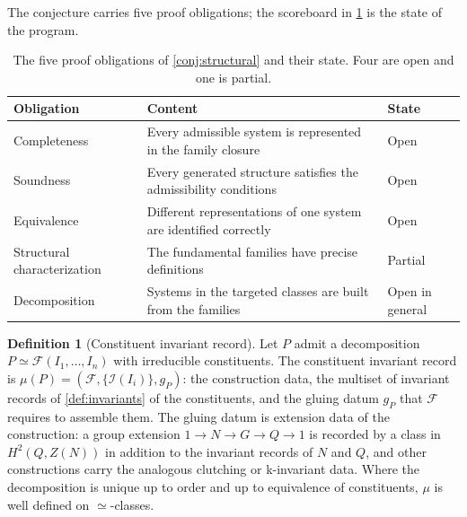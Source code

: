 \documentclass[11pt,letterpaper]{article}
\theoremstyle{definition}
\newtheorem{definition}[theorem]{Definition}
\begin{document}
The conjecture carries five proof obligations; the scoreboard in \cref{tab:obligations} is the state of the program.

\begin{table}[htbp]
\caption{The five proof obligations of \cref{conj:structural} and their state. Four are open and one is partial.}
\label{tab:obligations}
\small
\begin{tabularx}{\textwidth}{>{\hsize=0.77\hsize\raggedright\arraybackslash}X >{\hsize=1.67\hsize\raggedright\arraybackslash}X >{\hsize=0.56\hsize\raggedright\arraybackslash}X}
\toprule
Obligation & Content & State \\
\midrule
Completeness & Every admissible system is represented in the family closure & Open \\
Soundness & Every generated structure satisfies the admissibility conditions & Open \\
Equivalence & Different representations of one system are identified correctly & Open \\
Structural characterization & The fundamental families have precise definitions & Partial \\
Decomposition & Systems in the targeted classes are built from the families & Open in general \\
\bottomrule
\end{tabularx}
\end{table}

\begin{definition}[Constituent invariant record]
\label{def:constituent}
Let $P$ admit a decomposition $P \simeq \mathcal{F}(I_1, \ldots, I_n)$ with irreducible constituents. The constituent invariant record is $\mu(P) = (\mathcal{F}, \{\mathcal{I}(I_i)\}, g_P)$: the construction data, the multiset of invariant records of \cref{def:invariants} of the constituents, and the gluing datum $g_P$ that $\mathcal{F}$ requires to assemble them. The gluing datum is extension data of the construction: a group extension $1 \to N \to G \to Q \to 1$ is recorded by a class in $H^2(Q, Z(N))$ in addition to the invariant records of $N$ and $Q$, and other constructions carry the analogous clutching or k-invariant data. Where the decomposition is unique up to order and up to equivalence of constituents, $\mu$ is well defined on $\simeq$-classes.
\end{definition}
\end{document}
